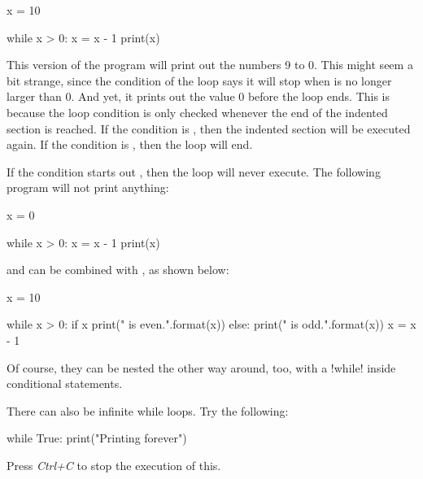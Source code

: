 \documentclass[11pt]{cselabheader}
\begin{document}
\begin{python3code}
x = 10

while x > 0:
    x = x - 1
    print(x)
\end{python3code}

This version of the program will print out the numbers 9 to 0. This might seem a
bit strange, since the condition of the loop says it will stop when
 is no longer larger than 0. And yet, it prints out the value 0
before the loop ends. This is because the loop condition is only checked
whenever the end of the indented section is reached. If the condition is
, then the indented section will be executed again. If the
condition is , then the loop will end.

If the condition starts out , then the loop will never execute.
The following program will not print anything:

\begin{python3code}
x = 0

while x > 0:
    x = x - 1
    print(x)
\end{python3code}

 and  can be combined with , as
shown below:

\begin{python3code}
x = 10

while x > 0:
    if x %
        print("{} is even.".format(x))
    else:
        print("{} is odd.".format(x))
    x = x - 1
\end{python3code}

Of course, they can be nested the other way around, too, with a
\pythoninline!while! inside conditional statements.

There can also be infinite while loops. Try the following:
\begin{python3code}
while True:
    print("Printing forever")
\end{python3code}

Press \emph{Ctrl+C} to stop the execution of this.
\end{document}

